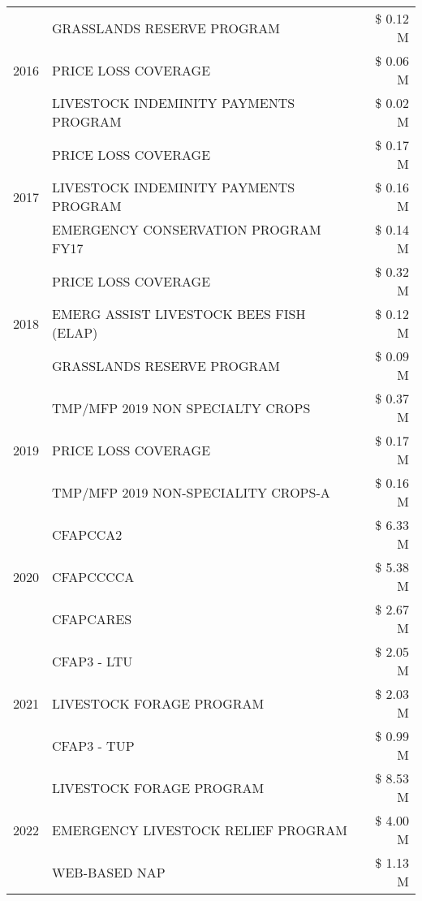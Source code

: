 \begin{tabular}{llr}
\cline{1-3}
\multirow[t]{3}{*}{2016} & GRASSLANDS RESERVE PROGRAM & \$ 0.12 M \\
 & PRICE LOSS COVERAGE & \$ 0.06 M \\
 & LIVESTOCK INDEMINITY PAYMENTS PROGRAM & \$ 0.02 M \\
\cline{1-3}
\multirow[t]{3}{*}{2017} & PRICE LOSS COVERAGE & \$ 0.17 M \\
 & LIVESTOCK INDEMINITY PAYMENTS PROGRAM & \$ 0.16 M \\
 & EMERGENCY CONSERVATION PROGRAM FY17 & \$ 0.14 M \\
\cline{1-3}
\multirow[t]{3}{*}{2018} & PRICE LOSS COVERAGE & \$ 0.32 M \\
 & EMERG ASSIST LIVESTOCK BEES FISH (ELAP) & \$ 0.12 M \\
 & GRASSLANDS RESERVE PROGRAM & \$ 0.09 M \\
\cline{1-3}
\multirow[t]{3}{*}{2019} & TMP/MFP 2019 NON SPECIALTY CROPS & \$ 0.37 M \\
 & PRICE LOSS COVERAGE & \$ 0.17 M \\
 & TMP/MFP 2019 NON-SPECIALITY CROPS-A & \$ 0.16 M \\
\cline{1-3}
\multirow[t]{3}{*}{2020} & CFAPCCA2 & \$ 6.33 M \\
 & CFAPCCCCA & \$ 5.38 M \\
 & CFAPCARES & \$ 2.67 M \\
\cline{1-3}
\multirow[t]{3}{*}{2021} & CFAP3 - LTU & \$ 2.05 M \\
 & LIVESTOCK FORAGE PROGRAM & \$ 2.03 M \\
 & CFAP3 - TUP & \$ 0.99 M \\
\cline{1-3}
\multirow[t]{3}{*}{2022} & LIVESTOCK FORAGE PROGRAM & \$ 8.53 M \\
 & EMERGENCY LIVESTOCK RELIEF PROGRAM & \$ 4.00 M \\
 & WEB-BASED NAP & \$ 1.13 M \\
\cline{1-3}
\bottomrule
\end{tabular}
